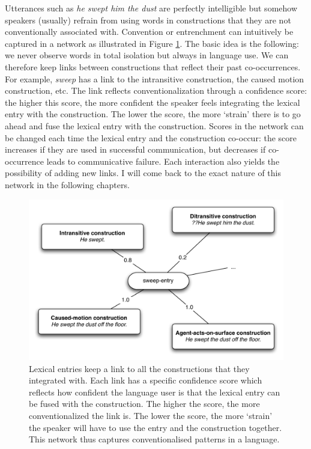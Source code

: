 Utterances such as {\em *he swept him the dust} are perfectly intelligible but somehow speakers (usually) refrain from using words in constructions that they are not conventionally associated with. Convention or entrenchment can intuitively be captured in a network as illustrated in Figure \ref{f:network-sweep}. The basic idea is the following: we never observe words in total isolation but always in language use. We can therefore keep links between constructions that reflect their past co-occurrences. For example, {\em sweep} has a link to the intransitive construction, the caused motion construction, etc. The link reflects conventionalization through a confidence score: the higher this score, the more confident the speaker feels integrating the lexical entry with the construction. The lower the score, the more `strain' there is to go ahead and fuse the lexical entry with the construction. Scores in the network can be changed each time the lexical entry and the construction co-occur: the score increases if they are used in successful communication, but decreases if co-occurrence leads to communicative failure. Each interaction also yields the possibility of adding new links. I will come back to the exact nature of this network in the following chapters.
\begin{figure}[tb]
\centerline{\includegraphics[width=\linewidth]{Chapter2/figs/network}}
 \caption[Network for {\em sweep}]{Lexical entries keep a link to all the constructions that they integrated with. Each link has a specific confidence score which reflects how confident the language user is that the lexical entry can be fused with the construction. The higher the score, the more conventionalized the link is. The lower the score, the more `strain' the speaker will have to use the entry and the construction together. This network thus captures conventionalised patterns in a language.}
   \label{f:network-sweep}
\end{figure}

